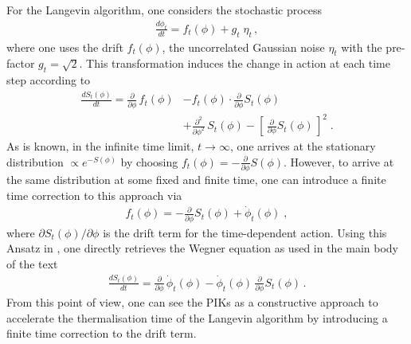 \documentclass[reprint,amsmath,amssymb,aps,pra,superscriptaddress,nofootinbib,twocolumn,floatfix,nolongbibliography]{revtex4-2}
\begin{document}
For the Langevin algorithm, one considers the stochastic process
%
\begin{align}
    \frac{d\phi_t}{dt} = f_t(\phi) + g_t \; \eta_t\,,
\end{align}
%
where one uses the drift $f_t(\phi)$, the uncorrelated Gaussian noise $\eta_t$ with the pre-factor $g_t =\sqrt{2}$. This transformation induces the change in action at each time step according to
%
\begin{align}\label{eq:LangevinFokkerPlanck}
    \frac{d S_t(\phi)}{dt} = \frac{\partial}{\partial \phi} \, f_t(\phi) &- f_t(\phi) \cdot \frac{\partial}{\partial \phi} S_t(\phi) \nonumber \\[1ex]
    &+ \frac{\partial^2}{\partial \phi^2} \, S_t(\phi) - \left[\,\frac{\partial}{\partial \phi} S_t(\phi) \, \right]^2\;. 
\end{align}
%
As is known, in the infinite time limit, $t\to \infty$, one arrives at the stationary distribution $\propto e^{-S(\phi)}$ by choosing $f_t(\phi) = -\frac{\partial}{\partial \phi}  S(\phi)$. However, to arrive at the same distribution at some fixed and finite time, one can introduce a finite time correction to this approach via
%
\begin{align}
    f_t(\phi) = - \frac{\partial}{\partial \phi} S_t(\phi) + \dot{\phi}_t(\phi)\;,
\end{align}
%
where $\partial S_t(\phi)/\partial \phi$ is the drift term for the time-dependent action. Using this Ansatz in , one directly retrieves the Wegner equation as used in the main body of the text
%
\begin{align}
    \frac{d S_t(\phi)}{dt} = \frac{\partial}{\partial \phi} \, \dot{\phi}_t(\phi) - \dot{\phi}_t(\phi) \, \frac{\partial}{\partial \phi} S_t(\phi)\,.
\end{align}
%
From this point of view, one can see the PIKs as a constructive approach to accelerate the thermalisation time of the Langevin algorithm by introducing a finite time correction to the drift term.

\small


\end{document}
